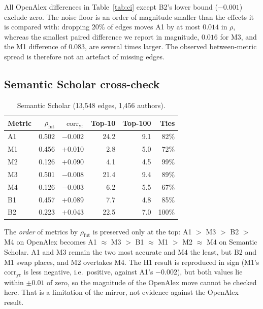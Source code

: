 \documentclass{article}
\begin{document}
All OpenAlex differences in Table~\ref{tab:ci} except B2's lower bound ($-0.001$) exclude zero.
The noise floor is an order of magnitude smaller than the effects it is compared with: dropping
20\% of edges moves A1 by at most $0.014$ in $\rho$, whereas the smallest paired difference we
report in magnitude, $0.016$ for M3, and the M1 difference of $0.083$, are several times larger.
The observed between-metric spread is therefore not an artefact of missing edges.

\subsection{Semantic Scholar cross-check}

\begin{table}[h]
\caption{Semantic Scholar (13,548 edges, 1,456 authors).}
\label{tab:s2}
\centering
\footnotesize
\setlength{\tabcolsep}{3.5pt}
\begin{tabular}{lrrrrr}
\toprule
\textbf{Metric} & $\rho_{\text{fut}}$ & $\text{corr}_{\text{yr}}$ & \textbf{Top-10} & \textbf{Top-100} & \textbf{Ties} \\
\midrule
A1 & 0.502 & $-$0.002 & 24.2 & 9.1  & 82\% \\
M1 & 0.456 & $+$0.010 & 2.8  & 5.0  & 72\% \\
M2 & 0.126 & $+$0.090 & 4.1  & 4.5  & 99\% \\
M3 & 0.501 & $-$0.008 & 21.4 & 9.4  & 89\% \\
M4 & 0.126 & $-$0.003 & 6.2  & 5.5  & 67\% \\
B1 & 0.457 & $+$0.089 & 7.7  & 4.8  & 85\% \\
B2 & 0.223 & $+$0.043 & 22.5 & 7.0  & 100\% \\
\bottomrule
\end{tabular}
\end{table}

The \emph{order} of metrics by $\rho_{\text{fut}}$ is preserved only at the top: A1 $>$ M3 $>$
B2 $>$ M4 on OpenAlex becomes A1 $\approx$ M3 $>$ B1 $\approx$ M1 $>$ M2 $\approx$ M4 on Semantic
Scholar. A1 and M3 remain the two most accurate and M4 the least, but B2 and M1 swap places, and
M2 overtakes M4. The H1 result is reproduced in sign (M1's $\text{corr}_{\text{yr}}$ is less
negative, i.e.\ positive, against A1's $-0.002$), but both values lie within $\pm 0.01$ of zero,
so the magnitude of the OpenAlex move cannot be checked here. That is a limitation of the mirror,
not evidence against the OpenAlex result.
\end{document}
